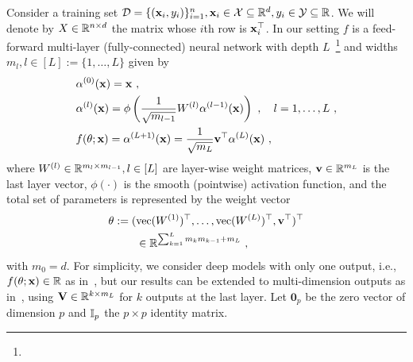 
Consider a training set ${\cal D} = \{(\mathbf{x}_i,y_i)\}_{i=1}^n, \mathbf{x}_i \in {\cal X} \subseteq \mathbb{R}^d, y_i \in {\cal Y} \subseteq \mathbb{R}$. We will denote by $X\in\mathbb{R}^{n\times d}$ the matrix whose $i$th row is $\mathbf{x}_i^\top$. 
In our setting $f$ is a feed-forward multi-layer (fully-connected) neural network with depth $L$~\footnote{}
 and widths $m_l, l \in [L] := \{1,\ldots,L\}$ given by
\begin{equation}
\begin{split}
    &\alpha^{(0)}(\mathbf{x})  = \mathbf{x}~, \\
     &\alpha^{(l)}(\mathbf{x}) = \phi \left( \frac{1}{\sqrt{m_{l-1}}} W^{(l)} \alpha^{(l-1)}(\mathbf{x}) \right)~,~~~l=1,\ldots,L~,\\
    &f(\theta;\mathbf{x})  = \alpha^{(L+1)}(\mathbf{x}) = \frac{1}{\sqrt{m_L}} \mathbf{v}^\top \alpha^{(L)}(\mathbf{x})~,
    \end{split}
\label{eq:DNN}    
\end{equation}
where $W^{(l)} \in \mathbb{R}^{m_l \times m_{l-1}}, l \in [L]$ are layer-wise weight matrices, $\mathbf{v}\in\mathbb{R}^{m_{L}}$ is the last layer vector, $\phi(\cdot )$ is the smooth (pointwise) activation function, and the total set of parameters is represented by the weight vector 
\begin{align}
\theta &:= (\operatorname{vec}(W^{(1)})^\top,\ldots,\operatorname{vec}(W^{(L)})^\top, \mathbf{v}^\top )^\top \nonumber \\
&~~~~~~\in \mathbb{R}^{\sum_{k=1}^L m_k m_{k-1}+m_{L}}~,
\label{eq:theta_def}
\end{align}
with $m_0=d$.  For simplicity, we consider deep models with only one output, i.e., $f(\theta;\mathbf{x}) \in \mathbb{R}$ as in~\citep{SD-JL-HL-LW-XZ:19}, but our results can be extended to multi-dimension outputs as in~\citep{DZ-QG:19}, using $\mathbf{V} \in \mathbb{R}^{k \times m_L}$ for $k$ outputs at the last layer. 
  Let $\bm{0}_p$ be the zero vector of dimension $p$ and $\mathbb{I}_p$ the $p\times p$ identity matrix.


